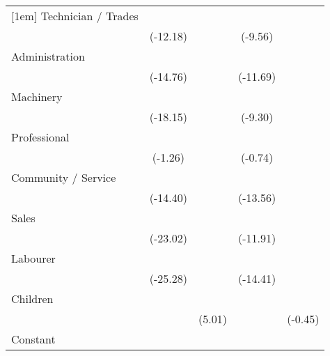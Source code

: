 {\begin{tabular}{l*{4}{c}}
[1em]
Technician / Trades &            \sym{***}&                     &            \sym{***}&                     \\
                    &    (-12.18)         &                     &     (-9.56)         &                     \\
[1em]
Administration      &            \sym{***}&                     &            \sym{***}&                     \\
                    &    (-14.76)         &                     &    (-11.69)         &                     \\
[1em]
Machinery           &            \sym{***}&                     &            \sym{***}&                     \\
                    &    (-18.15)         &                     &     (-9.30)         &                     \\
[1em]
Professional        &                     &                     &                     &                     \\
                    &     (-1.26)         &                     &     (-0.74)         &                     \\
[1em]
Community / Service &            \sym{***}&                     &            \sym{***}&                     \\
                    &    (-14.40)         &                     &    (-13.56)         &                     \\
[1em]
Sales               &            \sym{***}&                     &            \sym{***}&                     \\
                    &    (-23.02)         &                     &    (-11.91)         &                     \\
[1em]
Labourer            &            \sym{***}&                     &            \sym{***}&                     \\
                    &    (-25.28)         &                     &    (-14.41)         &                     \\
[1em]
Children            &                     &            \sym{***}&                     &                     \\
                    &                     &      (5.01)         &                     &     (-0.45)         \\
[1em]
Constant            &            \sym{***}&            \sym{***}&            \sym{***}&            \sym{***}\\

\end{tabular}}
